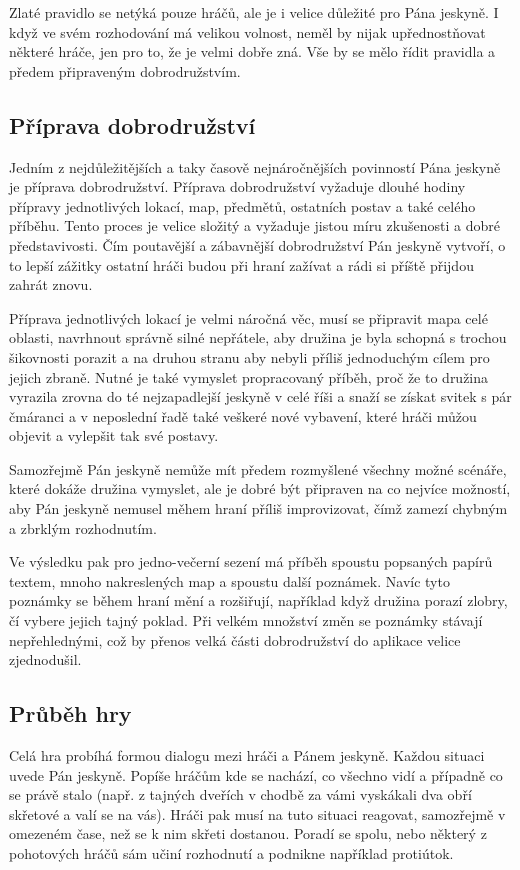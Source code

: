 \documentclass[thesis=B,czech]{resources/FITthesis}[2012/06/26]
\begin{document}
Zlaté pravidlo se netýká pouze hráčů, ale je i velice důležité pro Pána jeskyně. I když ve svém rozhodování má velikou volnost, neměl by nijak upřednostňovat některé hráče, jen pro to, že je velmi dobře zná. Vše by se mělo řídit pravidla a předem připraveným dobrodružstvím. 


	\subsection{Příprava dobrodružství}
Jedním z nejdůležitějších a taky časově nejnáročnějších povinností Pána jeskyně je příprava dobrodružství. Příprava dobrodružství vyžaduje dlouhé hodiny přípravy jednotlivých lokací, map, předmětů, ostatních postav a také celého příběhu. Tento proces je velice složitý a vyžaduje jistou míru zkušenosti a dobré představivosti. Čím poutavější a zábavnější dobrodružství Pán jeskyně vytvoří, o to lepší zážitky ostatní hráči budou při hraní zažívat a rádi si příště přijdou zahrát znovu. \par
Příprava jednotlivých lokací je velmi náročná věc, musí se připravit mapa celé oblasti, navrhnout správně silné nepřátele, aby družina je byla schopná s trochou šikovnosti porazit a na druhou stranu aby nebyli příliš jednoduchým cílem pro jejich zbraně. Nutné je také vymyslet propracovaný příběh, proč že to družina vyrazila zrovna do té nejzapadlejší jeskyně v celé říši a snaží se získat svitek s pár čmáranci a v neposlední řadě také veškeré nové vybavení, které hráči můžou objevit a vylepšit tak své postavy. \par
Samozřejmě Pán jeskyně nemůže mít předem rozmyšlené všechny možné scénáře, které dokáže družina vymyslet, ale je dobré být připraven na co nejvíce možností, aby Pán jeskyně nemusel měhem hraní příliš improvizovat, čímž zamezí chybným a zbrklým rozhodnutím. \par
Ve výsledku pak pro jedno-večerní sezení má příběh spoustu popsaných papírů textem, mnoho nakreslených map a spoustu další poznámek. Navíc tyto poznámky se během hraní mění a rozšiřují, například když družina porazí zlobry, čí vybere jejich tajný poklad. Při velkém množství změn se poznámky stávají nepřehlednými, což by přenos velká části dobrodružství do aplikace velice zjednodušil. 
	
	\subsection{Průběh hry}
Celá hra probíhá formou dialogu mezi hráči a Pánem jeskyně. Každou situaci uvede Pán jeskyně. Popíše hráčům kde se nachází, co všechno vidí a případně co se právě stalo (např. z tajných dveřích v chodbě za vámi vyskákali dva obří skřetové a valí se na vás). Hráči pak musí na tuto situaci reagovat, samozřejmě v omezeném čase, než se k nim skřeti dostanou. Poradí se spolu, nebo některý z pohotových hráčů sám učiní rozhodnutí a podnikne například protiútok. \par
\end{document}
